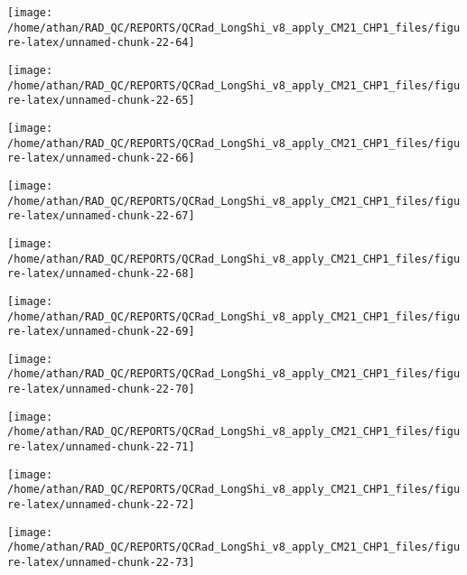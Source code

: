 \documentclass[
  10pt,
  a4paper,oneside]{article}
\begin{document}
\begin{center}\texttt{[image: /home/athan/RAD\_QC/REPORTS/QCRad\_LongShi\_v8\_apply\_CM21\_CHP1\_files/figure-latex/unnamed-chunk-22-64]} \end{center}

\begin{center}\texttt{[image: /home/athan/RAD\_QC/REPORTS/QCRad\_LongShi\_v8\_apply\_CM21\_CHP1\_files/figure-latex/unnamed-chunk-22-65]} \end{center}

\begin{center}\texttt{[image: /home/athan/RAD\_QC/REPORTS/QCRad\_LongShi\_v8\_apply\_CM21\_CHP1\_files/figure-latex/unnamed-chunk-22-66]} \end{center}

\begin{center}\texttt{[image: /home/athan/RAD\_QC/REPORTS/QCRad\_LongShi\_v8\_apply\_CM21\_CHP1\_files/figure-latex/unnamed-chunk-22-67]} \end{center}

\begin{center}\texttt{[image: /home/athan/RAD\_QC/REPORTS/QCRad\_LongShi\_v8\_apply\_CM21\_CHP1\_files/figure-latex/unnamed-chunk-22-68]} \end{center}

\begin{center}\texttt{[image: /home/athan/RAD\_QC/REPORTS/QCRad\_LongShi\_v8\_apply\_CM21\_CHP1\_files/figure-latex/unnamed-chunk-22-69]} \end{center}

\begin{center}\texttt{[image: /home/athan/RAD\_QC/REPORTS/QCRad\_LongShi\_v8\_apply\_CM21\_CHP1\_files/figure-latex/unnamed-chunk-22-70]} \end{center}

\begin{center}\texttt{[image: /home/athan/RAD\_QC/REPORTS/QCRad\_LongShi\_v8\_apply\_CM21\_CHP1\_files/figure-latex/unnamed-chunk-22-71]} \end{center}

\begin{center}\texttt{[image: /home/athan/RAD\_QC/REPORTS/QCRad\_LongShi\_v8\_apply\_CM21\_CHP1\_files/figure-latex/unnamed-chunk-22-72]} \end{center}

\begin{center}\texttt{[image: /home/athan/RAD\_QC/REPORTS/QCRad\_LongShi\_v8\_apply\_CM21\_CHP1\_files/figure-latex/unnamed-chunk-22-73]} \end{center}
\end{document}

